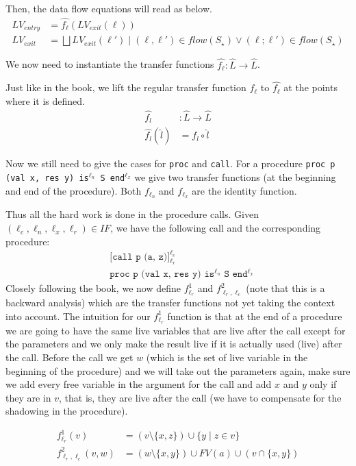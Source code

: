 \documentclass[a4wide,12pt]{article}
\theoremstyle{definition}
\theoremstyle{plain}
\theoremstyle{remark}
\begin{document}
Then, the data flow equations will read as below.
\begin{align*}
LV_{entry} & = \widehat{f_\ell}(LV_{exit}(\ell)) \\
LV_{exit} &= \bigsqcup{LV_{exit}(\ell') \mid (\ell,\ell') \in flow(S_\star) \lor (\ell;\ell') \in flow(S_\star)}
\end{align*}

We now need to instantiate the transfer functions $\widehat{f_\ell} : \hat{L} \to \hat{L}$.

Just like in the book, we lift the regular transfer function $f_\ell$ to $\widehat{f_\ell}$ at the points
where it is defined.
\begin{align*}
\widehat{f_l} & : \widehat{L} \to \widehat {L} \\
\widehat{f_l} (\widehat{l}) & = f_l \circ \widehat{l}
\end{align*}

Now we still need to give the cases for \texttt{proc} and \texttt{call}. For
a procedure
\texttt{proc p (val x, res y) is$^{\ell_n}$ S end$^{\ell_x}$}
we give two transfer functions (at the beginning and end of the procedure).
Both $f_{\ell_n}$ and $f_{\ell_x}$ are the identity function.

Thus all the hard work is
done in the procedure calls.
Given $(\ell_c, \ell_n, \ell_x, \ell_r) \in IF$, we have the following call and the corresponding
procedure:
\begin{align*}
& \texttt{[call p (a, z)]$^{\ell_c}_{\ell_r}$} \\
& \texttt{proc p (val x, res y) is$^{\ell_n}$ S end$^{\ell_x}$}
\end{align*}
Closely following the book, we now define $f^1_{\ell_r}$ and $f^2_{\ell_r,\ell_c}$ (note that
this is a backward analysis) which are the transfer functions not yet taking the context into account.  
The intuition for our $f^1_{\ell_r}$ function is that at the end of a procedure we are going
to have the same live variables that are live after the call except for the parameters and we only make the result
live if it is actually used (live) after the call. Before the call we get $w$ (which is the set of live variable 
in the beginning of the procedure) and we will
take out the parameters again, make sure we add every free variable in the
argument for the call and add $x$ and $y$ only if they are in $v$, that is, they are live after the call
(we have to compensate for the shadowing in the procedure).
 
\begin{align}
f^1_{\ell_r} (v) & = (v \setminus \{x, z\}) \cup \{y \mid z \in v\} \\
f^2_{\ell_r, \ell_c} (v, w) & = (w \setminus \{x, y\}) \cup FV(a) \cup (v \cap \{x, y\})
\end{align}
\end{document}
